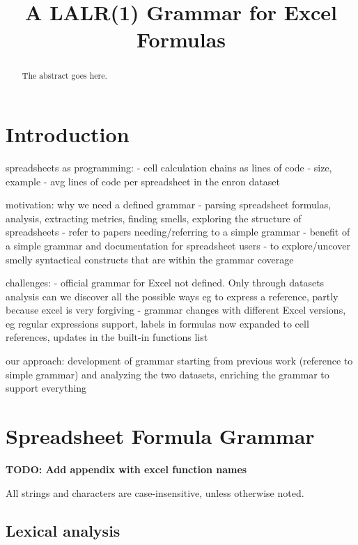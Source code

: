 \documentclass[conference]{IEEEtran}
\newcommand{\todo}[1]{\textbf{TODO: #1}}
\begin{document}
\title{A LALR(1) Grammar for Excel Formulas}

\maketitle


\begin{abstract}

The abstract goes here.
\end{abstract}

\IEEEpeerreviewmaketitle


\section{Introduction}

spreadsheets as programming:
- cell calculation chains as lines of code - size, example
- avg lines of code per spreadsheet in the enron dataset

motivation: why we need a defined grammar
- parsing spreadsheet formulas, analysis, extracting metrics, finding smells, exploring the structure of spreadsheets
- refer to papers needing/referring to a simple grammar
- benefit of a simple grammar and documentation for spreadsheet users
- to explore/uncover smelly syntactical constructs that are within the grammar coverage

challenges:
- official grammar for Excel not defined. Only through datasets analysis can we discover all the possible ways eg to 
express a reference, partly because excel is very forgiving
- grammar changes with different Excel versions, eg regular expressions support, labels in formulas now expanded to cell
references, updates in the built-in functions list

our approach:
development of grammar starting from previous work (reference to simple grammar) and analyzing the two datasets, enriching the
grammar to support everything

\section{Spreadsheet Formula Grammar}

\todo{Add appendix with excel function names}

All strings and characters are case-insensitive, unless otherwise noted.

\subsection{Lexical analysis}
\end{document}
